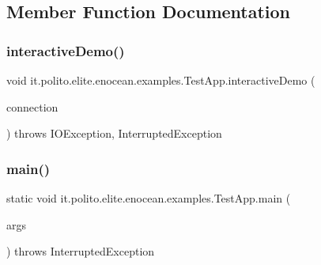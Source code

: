 \subsection{Member Function Documentation}
\hypertarget{classit_1_1polito_1_1elite_1_1enocean_1_1examples_1_1_test_app_a0deb4d651135f6f9a09d656c1b76f1cf}{}\label{classit_1_1polito_1_1elite_1_1enocean_1_1examples_1_1_test_app_a0deb4d651135f6f9a09d656c1b76f1cf} 
\subsubsection{\texorpdfstring{interactive\+Demo()}{interactiveDemo()}}
{\footnotesize\ttfamily void it.\+polito.\+elite.\+enocean.\+examples.\+Test\+App.\+interactive\+Demo (\begin{DoxyParamCaption}\item[{\hyperlink{classit_1_1polito_1_1elite_1_1enocean_1_1enj_1_1communication_1_1_en_j_connection}{En\+J\+Connection}}]{connection }\end{DoxyParamCaption}) throws I\+O\+Exception, 			Interrupted\+Exception}

\hypertarget{classit_1_1polito_1_1elite_1_1enocean_1_1examples_1_1_test_app_a0c43e0505d5b029fd18071bd76f46bc8}{}\label{classit_1_1polito_1_1elite_1_1enocean_1_1examples_1_1_test_app_a0c43e0505d5b029fd18071bd76f46bc8} 
\subsubsection{\texorpdfstring{main()}{main()}}
{\footnotesize\ttfamily static void it.\+polito.\+elite.\+enocean.\+examples.\+Test\+App.\+main (\begin{DoxyParamCaption}\item[{String \mbox{[}$\,$\mbox{]}}]{args }\end{DoxyParamCaption}) throws Interrupted\+Exception\hspace{0.3cm}{\ttfamily [static]}}


